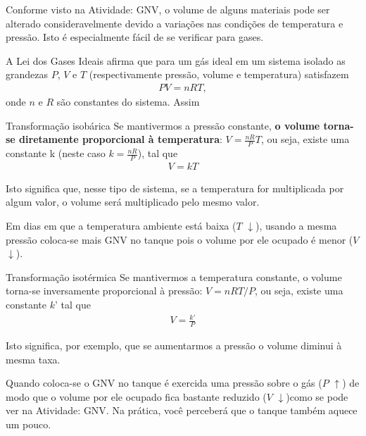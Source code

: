 \begin{reflection}{}

Conforme visto na Atividade: GNV, o volume de alguns materiais pode ser alterado consideravelmente devido a variações nas condições de temperatura e pressão. Isto é especialmente fácil de se verificar para gases.

A Lei dos Gases Ideais afirma que para um gás ideal em um sistema isolado as grandezas $P$, $V$ e $T$ (respectivamente pressão, volume e temperatura) satisfazem
\begin{equation*}
\begin{split}PV=nRT,\end{split}
\end{equation*}
onde $n$ e $R$ são constantes do sistema. Assim
\begin{observationtitle}{Transformação isobárica} 
Se mantivermos a pressão constante, \textbf{o volume torna-se diretamente proporcional à temperatura}: \(V=\frac{nR}{P}T\), ou seja, existe uma constante k (neste caso \(k=\frac{nR}{P}\)), tal que
\begin{equation*}
\begin{split}V=kT\end{split}
\end{equation*}
\end{observationtitle}
Isto significa que, nesse tipo de sistema, se a temperatura for multiplicada por algum valor, o volume será multiplicado pelo mesmo valor.

Em dias em que a temperatura ambiente está baixa ($T$ \(\downarrow\)), usando a mesma pressão coloca-se mais GNV no tanque pois o volume por ele ocupado é menor ($V$ \(\downarrow\)).
\begin{observationtitle}{Transformação isotérmica} 
Se mantivermos a temperatura constante, o volume torna-se inversamente proporcional à pressão: $V = nRT / P$, ou seja, existe uma constante $k’$ tal que
\begin{equation*}
\begin{split}V=\frac{k'}{P}\end{split}
\end{equation*}
\end{observationtitle}
Isto significa, por exemplo, que se aumentarmos a pressão o volume diminui à mesma taxa.

Quando coloca-se o GNV no tanque é exercida uma pressão sobre o gás ($P$ \(\uparrow\)) de modo que o volume por ele ocupado fica bastante reduzido ($V$ \(\downarrow\))como se pode ver na Atividade: GNV. Na prática, você perceberá que o tanque também aquece um pouco.


\end{reflection}
